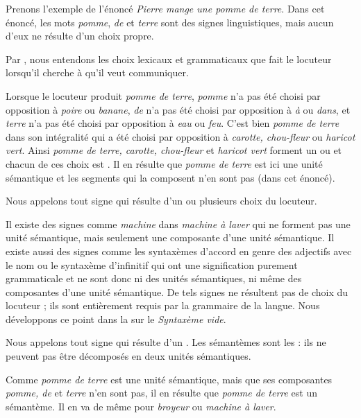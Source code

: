 Prenons l’exemple de l’énoncé \textit{Pierre mange une pomme de terre}. Dans cet énoncé, les mots \textit{pomme}, \textit{de} et \textit{terre} sont des signes linguistiques, mais aucun d’eux ne résulte d’un choix propre.

{Par , nous entendons les choix lexicaux et grammaticaux que fait le locuteur lorsqu’il cherche à  qu’il veut communiquer.}

Lorsque le locuteur produit \textit{pomme de terre}, \textit{pomme} n’a pas été choisi par opposition à \textit{poire} ou \textit{banane}, \textit{de} n’a pas été choisi par opposition à \textit{à} ou \textit{dans}, et \textit{terre} n’a pas été choisi par opposition à \textit{eau} ou \textit{feu}. C’est bien \textit{pomme de terre} dans son intégralité qui a été choisi par opposition à \textit{carotte, chou-fleur} ou \textit{haricot vert}. Ainsi \textit{pomme de terre, carotte, chou-fleur} et \textit{haricot vert} forment un  ou  et chacun de ces choix est . Il en résulte que \textit{pomme de terre} est ici une unité sémantique et les segments qui la composent n’en sont pas (dans cet énoncé).

{Nous appelons  tout signe qui résulte d’un ou plusieurs choix du locuteur.}

Il existe des signes comme \textit{machine} dans \textit{machine à laver} qui ne forment pas une unité sémantique, mais seulement une composante d’une unité sémantique. Il existe aussi des signes comme les syntaxèmes d’accord en genre des adjectifs avec le nom ou le syntaxème d’infinitif qui ont une signification purement grammaticale et ne sont donc ni des unités sémantiques, ni même des composantes d’une unité sémantique. De tels signes ne résultent pas de choix du locuteur ; ils sont entièrement requis par la grammaire de la langue. Nous développons ce point dans la  sur le \textit{Syntaxème vide}.

{Nous appelons  tout signe qui résulte d’un . Les sémantèmes sont les  : ils ne peuvent pas être décomposés en deux unités sémantiques.}

Comme \textit{pomme de terre} est une unité sémantique, mais que ses composantes \textit{pomme, de} et \textit{terre} n’en sont pas, il en résulte que \textit{pomme de terre} est un sémantème. Il en va de même pour \textit{broyeur} ou \textit{machine à laver}.

